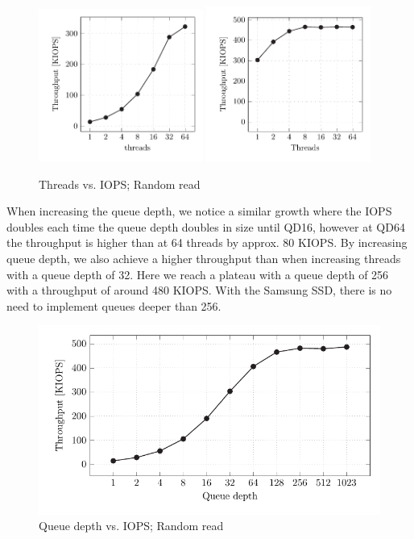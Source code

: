 \begin{figure}[H]
  \centering
   {\includegraphics[width=0.48\textwidth]{figures/vroom-iops-thread} \label{fig:vroom-iops-thread-qd1}}
   {\includegraphics[width=0.48\textwidth]{figures/vroom-iops-thread-qd32} \label{fig:vroom-iops-thread-qd32}}
  \caption{Threads vs. IOPS; Random read}
  \label{fig:vroom-iops-thread}
\end{figure}

When increasing the queue depth, we notice a similar growth where the IOPS doubles each time the queue depth doubles in size until QD16, however at QD64 the throughput is higher than at 64 threads by approx. 80 KIOPS. By increasing queue depth, we also achieve a higher throughput than when increasing threads with a queue depth of 32. Here we reach a plateau with a queue depth of 256 with a throughput of around 480 KIOPS. With the Samsung SSD, there is no need to implement queues deeper than 256.

\begin{figure}[H]
  \centering
  \includegraphics[width=\textwidth]{figures/vroom-iops-qd}
  \caption{Queue depth vs. IOPS; Random read}
  \label{fig:vroom-iops-qd}
\end{figure}

